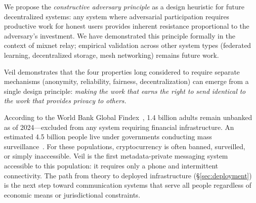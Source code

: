 \documentclass[11pt,a4paper]{article}
\begin{document}
We propose the \emph{constructive adversary principle} as a design heuristic for future decentralized systems: any system where adversarial participation requires productive work for honest users provides inherent resistance proportional to the adversary's investment. We have demonstrated this principle formally in the context of mixnet relay; empirical validation across other system types (federated learning, decentralized storage, mesh networking) remains future work.

Veil demonstrates that the four properties long considered to require separate mechanisms (anonymity, reliability, fairness, decentralization) can emerge from a single design principle: \emph{making the work that earns the right to send identical to the work that provides privacy to others.}

According to the World Bank Global Findex~\cite{worldbank}, 1.4 billion adults remain unbanked as of 2024---excluded from any system requiring financial infrastructure. An estimated 4.5 billion people live under governments conducting mass surveillance~\cite{freedomhouse}. For these populations, cryptocurrency is often banned, surveilled, or simply inaccessible. Veil is the first metadata-private messaging system accessible to this population: it requires only a phone and intermittent connectivity. The path from theory to deployed infrastructure (\S\ref{sec:deployment}) is the next step toward communication systems that serve all people regardless of economic means or jurisdictional constraints.

\end{document}
